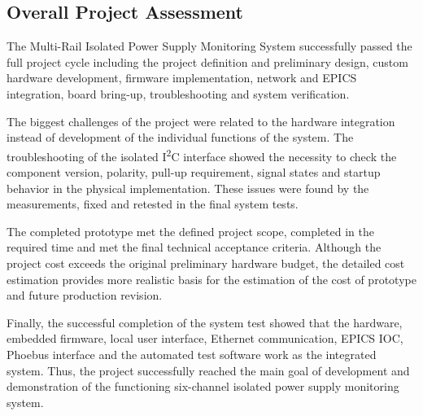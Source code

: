 \subsection{Overall Project Assessment}

The Multi-Rail Isolated Power Supply Monitoring System successfully passed the full project cycle including the project definition and preliminary design, custom hardware development, firmware implementation, network and EPICS integration, board bring-up, troubleshooting and system verification.

The biggest challenges of the project were related to the hardware integration instead of development of the individual functions of the system. The troubleshooting of the isolated I\textsuperscript{2}C interface showed the necessity to check the component version, polarity, pull-up requirement, signal states and startup behavior in the physical implementation. These issues were found by the measurements, fixed and retested in the final system tests.

The completed prototype met the defined project scope, completed in the required time and met the final technical acceptance criteria. Although the project cost exceeds the original preliminary hardware budget, the detailed cost estimation provides more realistic basis for the estimation of the cost of prototype and future production revision.

Finally, the successful completion of the system test showed that the hardware, embedded firmware, local user interface, Ethernet communication, EPICS IOC, Phoebus interface and the automated test software work as the integrated system. Thus, the project successfully reached the main goal of development and demonstration of the functioning six-channel isolated power supply monitoring system.